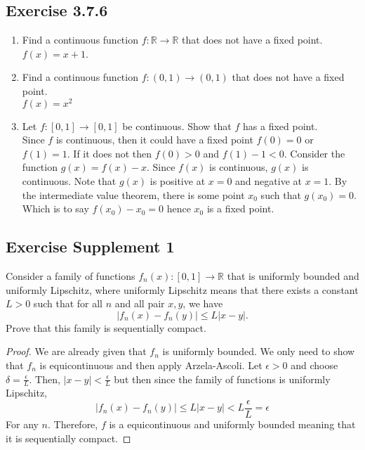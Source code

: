 \documentclass{tufte-book}
\theoremstyle{mytheoremstyle}
\theoremstyle{mylemstyle}
\theoremstyle{mydefstyle}
\begin{document}
\subsection{Exercise 3.7.6}
\begin{enumerate}
\item Find a continuous function $f: \mathbb{R} \to \mathbb{R}$ that does not have a fixed point.\\
$f(x) = x+1$.

\item Find a continuous function $f:(0,1) \to (0,1)$ that does not have a fixed point.\\
$f(x) = x^2$

\item Let $f:[0,1] \to [0,1]$ be continuous.  Show that $f$ has a fixed point.\\

Since $f$ is continuous, then it could have a fixed point $f(0) = 0$ or $f(1) = 1$.  If it does not then $f(0) > 0$ and $f(1)-1 < 0$.  Consider the function $g(x) = f(x) - x$.  Since $f(x)$ is continuous, $g(x)$ is continuous.  Note that $g(x)$ is positive at $x = 0$ and negative at $x  =1$.  By the intermediate value theorem, there is some point $x_0$ such that $g(x_0) = 0$.  Which is to say $f(x_0) - x_0 = 0$ hence $x_0$ is a fixed point.
\end{enumerate}

\subsection{Exercise Supplement 1}
Consider a family of functions $f_n(x): [0,1] \to \mathbb{R}$ that is uniformly bounded and uniformly Lipschitz, where uniformly Lipschitz means that there exists a constant $L>0$ such that for all $n$ and all pair $x,y$, we have
\[|f_n(x) - f_n(y)| \leq L|x-y|. \]
Prove that this family is sequentially compact.  

\begin{proof}

We are already given that $f_n$ is uniformly bounded.  We only need to show that $f_n$ is equicontinuous and then apply Arzela-Ascoli. Let $\epsilon >0$ and choose $\delta = \frac{\epsilon}{L}$.  Then, $|x-y| <\frac{\epsilon}{L}$ but then since the family of functions is uniformly Lipschitz,
\[|f_n(x) - f_n(y)| \leq L|x-y| < L \frac{\epsilon}{L} = \epsilon \]
For any $n$.  Therefore, $f$ is a equicontinuous and uniformly bounded meaning that it is sequentially compact.
\end{proof}
\end{document}
